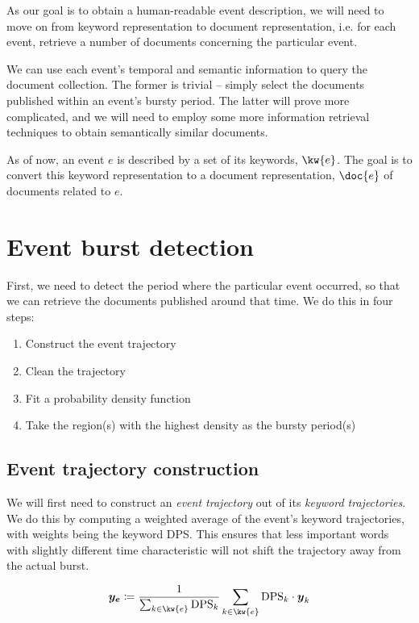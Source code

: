 As our goal is to obtain a human-readable event description, we will need to move on from keyword representation to document representation, i.e. for each event, retrieve a number of documents concerning the particular event.

We can use each event's temporal and semantic information to query the document collection. The former is trivial -- simply select the documents published within an event's bursty period. The latter will prove more complicated, and we will need to employ some more information retrieval techniques to obtain semantically similar documents.

As of now, an event $e$ is described by a set of its keywords, $\kw{e}$. The goal is to convert this keyword representation to a document representation, $\doc{e}$ of documents related to $e$.

\section{Event burst detection}
First, we need to detect the period where the particular event occurred, so that we can retrieve the documents published around that time. We do this in four steps:

\begin{enumerate}
	\item Construct the event trajectory
	\item Clean the trajectory
	\item Fit a probability density function
	\item Take the region(s) with the highest density as the bursty period(s)
\end{enumerate}


\subsection{Event trajectory construction}

We will first need to construct an \textit{event trajectory} out of its \textit{keyword trajectories}. We do this by computing a weighted average of the event's keyword trajectories, with weights being the keyword DPS. This ensures that less important words with slightly different time characteristic will not shift the trajectory away from the actual burst.

\begin{equation}
	\vect{\traj_{e}} \coloneqq \frac{1}{\sum_{k \in \kw{e}}{\text{DPS}_{k}}} \sum_{k \in \kw{e}}{\text{DPS}_{k} \cdot \vect{\traj}_{k}}
\end{equation}


